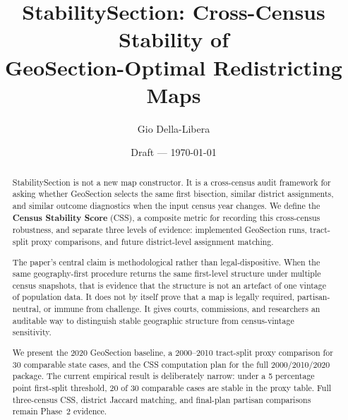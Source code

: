 \documentclass[12pt]{article}
\title{StabilitySection: Cross-Census Stability of\\
       GeoSection-Optimal Redistricting Maps}
\author{Gio Della-Libera}
\date{Draft --- \today}
\begin{document}
\maketitle

\begin{abstract}
StabilitySection is not a new map constructor.  It is a cross-census audit
framework for asking whether GeoSection selects the same first bisection,
similar district assignments, and similar outcome diagnostics when the input
census year changes.
We define the \textbf{Census Stability Score} (CSS), a composite metric for
recording this cross-census robustness, and separate three levels of evidence:
implemented GeoSection runs, tract-split proxy comparisons, and future
district-level assignment matching.

The paper's central claim is methodological rather than legal-dispositive.
When the same geography-first procedure returns the same first-level structure
under multiple census snapshots, that is evidence that the structure is not an
artefact of one vintage of population data.  It does not by itself prove that a
map is legally required, partisan-neutral, or immune from challenge.  It gives
courts, commissions, and researchers an auditable way to distinguish stable
geographic structure from census-vintage sensitivity.

We present the 2020 GeoSection baseline, a 2000--2010 tract-split proxy
comparison for 30 comparable state cases, and the CSS computation plan for the
full 2000/2010/2020 package.  The current empirical result is deliberately
narrow: under a 5 percentage point first-split threshold, 20 of 30 comparable
cases are stable in the proxy table.  Full three-census CSS, district Jaccard
matching, and final-plan partisan comparisons remain Phase~2 evidence.
\end{abstract}










\end{document}
